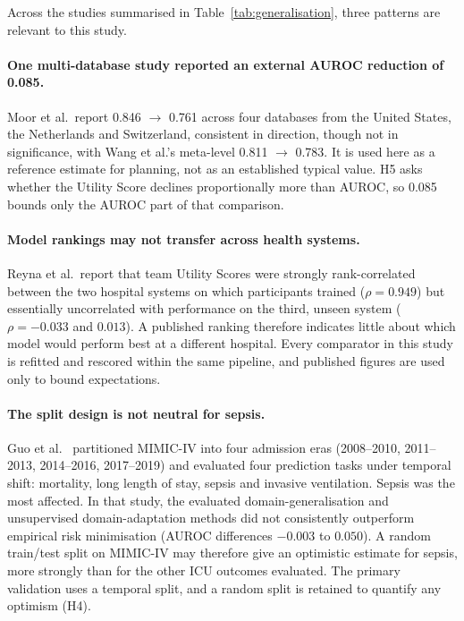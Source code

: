 Across the studies summarised in Table~\ref{tab:generalisation}, three
patterns are relevant to this study.

\paragraph{One multi-database study reported an external AUROC reduction of
0.085.} Moor et al.\ report 0.846 $\rightarrow$ 0.761 across four databases
from the United States, the Netherlands and Switzerland, consistent in
direction, though not in significance, with Wang et al.'s meta-level 0.811
$\rightarrow$ 0.783. It is used here as a reference estimate for planning, not
as an established typical value. H5 asks whether the Utility Score declines
proportionally more than AUROC, so 0.085 bounds only the AUROC part of that
comparison.

\paragraph{Model rankings may not transfer across health systems.} Reyna et
al.\ report that team Utility Scores were strongly rank-correlated between the
two hospital systems on which participants trained ($\rho = 0.949$) but
essentially uncorrelated with performance on the third, unseen system
($\rho = -0.033$ and $0.013$). A published ranking therefore indicates little
about which model would perform best at a different hospital. Every comparator
in this study is refitted and rescored within the same pipeline, and published
figures are used only to bound expectations.

\paragraph{The split design is not neutral for sepsis.}
Guo et al.\ \cite{guo2022temporal} partitioned MIMIC-IV into four admission
eras (2008--2010, 2011--2013, 2014--2016, 2017--2019) and evaluated four
prediction tasks under temporal shift: mortality, long length of stay, sepsis
and invasive ventilation. Sepsis was the most affected. In that study, the
evaluated domain-generalisation and unsupervised domain-adaptation methods did
not consistently outperform empirical risk minimisation (AUROC differences
$-0.003$ to $0.050$). A random train/test split on MIMIC-IV may therefore give
an optimistic estimate for sepsis, more strongly than for the other ICU
outcomes evaluated. The primary validation uses a temporal split, and a random
split is retained to quantify any optimism (H4).

